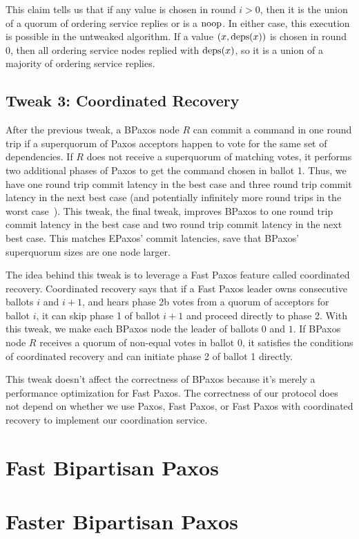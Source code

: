 \documentclass{mwhittaker}
\begin{document}
This claim tells us that if any value is chosen in round $i > 0$, then it is
the union of a quorum of ordering service replies or is a $\text{noop}$. In either
case, this execution is possible in the untweaked algorithm. If a value $(x,
\text{deps}(x))$ is chosen in round $0$, then all ordering service nodes replied with
$\text{deps}(x)$, so it is a union of a majority of ordering service replies.

\subsection{Tweak 3: Coordinated Recovery}
After the previous tweak, a BPaxos node $R$ can commit a command in one round
trip if a superquorum of Paxos acceptors happen to vote for the same set of
dependencies. If $R$ does not receive a superquorum of matching votes, it
performs two additional phases of Paxos to get the command chosen in ballot 1.
Thus, we have one round trip commit latency in the best case and three round
trip commit latency in the next best case (and potentially infinitely more
round trips in the worst case~\cite{fischer1982impossibility}). This tweak, the
final tweak, improves BPaxos to one round trip commit latency in the best case
and two round trip commit latency in the next best case. This matches EPaxos'
commit latencies, save that BPaxos' superquorum sizes are one node larger.

The idea behind this tweak is to leverage a Fast Paxos feature called
coordinated recovery. Coordinated recovery says that if a Fast Paxos leader
owns consecutive ballots $i$ and $i + 1$, and hears phase 2b votes from a
quorum of acceptors for ballot $i$, it can skip phase 1 of ballot $i + 1$ and
proceed directly to phase 2. With this tweak, we make each BPaxos node the
leader of ballots $0$ and $1$. If BPaxos node $R$ receives a quorum of
non-equal votes in ballot $0$, it satisfies the conditions of coordinated
recovery and can initiate phase 2 of ballot 1 directly.

This tweak doesn't affect the correctness of BPaxos because it's merely a
performance optimization for Fast Paxos. The correctness of our protocol does
not depend on whether we use Paxos, Fast Paxos, or Fast Paxos with coordinated
recovery to implement our coordination service.

\section{Fast Bipartisan Paxos}
\section{Faster Bipartisan Paxos}
\end{document}
